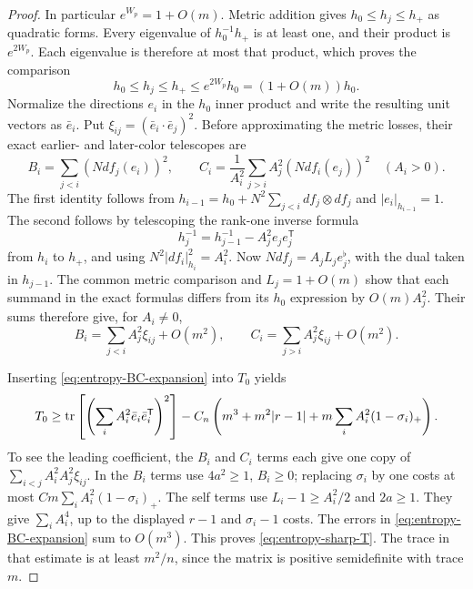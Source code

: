 \begin{proof}
In particular \(e^{W_p}=1+O(m)\).  Metric addition gives
\(h_0\leq h_j\leq h_+\) as quadratic forms.
Every eigenvalue of \(h_0^{-1}h_+\) is at least one, and their product
is \(e^{2W_p}\).  Each eigenvalue is therefore at most that product,
which proves the comparison
\[
 h_0\leq h_j\leq h_+\leq e^{2W_p}h_0=(1+O(m))h_0.
\]
Normalize the directions \(e_i\) in the \(h_0\) inner product and write
the resulting unit vectors as \(\bar e_i\).  Put
\(\xi_{ij}=(\bar e_i\cdot\bar e_j)^2\).  Before approximating the metric
losses, their exact earlier- and later-color telescopes are
\[
 B_i=\sum_{j<i}(Ndf_j(e_i))^2,\qquad
 C_i=\frac1{A_i^2}\sum_{j>i}A_j^2(Ndf_i(e_j))^2
       \quad(A_i>0).
\]
The first identity follows from
\(h_{i-1}=h_0+N^2\sum_{j<i}df_j\otimes df_j\) and
\(|e_i|_{h_{i-1}}=1\).  The second follows by telescoping the rank-one
inverse formula
\[
 h_j^{-1}=h_{j-1}^{-1}-A_j^2 e_j e_j^{\mathsf T}
\]
from \(h_i\) to \(h_+\), and using
\(N^2|df_i|_{h_i}^2=A_i^2\).  Now
\(Ndf_j=A_jL_j e_j^\flat\), with the dual taken in \(h_{j-1}\).
The common metric comparison and \(L_j=1+O(m)\) show that each summand
in the exact formulas differs from its \(h_0\) expression by
\(O(m)A_j^2\).  Their sums therefore give, for \(A_i\ne0\),
\begin{equation}\label{eq:entropy-BC-expansion}
 B_i=\sum_{j<i}A_j^2\xi_{ij}+O(m^2),\qquad
 C_i=\sum_{j>i}A_j^2\xi_{ij}+O(m^2).
\end{equation}

Inserting \eqref{eq:entropy-BC-expansion} into \(T_0\) yields
\begin{equation}\label{eq:entropy-sharp-T}
 T_0\geq
 \operatorname{tr}\left[\left(\sum_i A_i^2\bar e_i\bar e_i^{\mathsf T}\right)^2\right]
 -C_n\left(m^3+m^2|r-1|
              +m\sum_iA_i^2(1-\sigma_i)_+\right).
\end{equation}
To see the leading coefficient, the \(B_i\) and \(C_i\) terms each
give one copy of
\(\sum_{i<j}A_i^2A_j^2\xi_{ij}\).  In the \(B_i\) terms use
\(4a^2\geq1\), \(B_i\geq0\); replacing \(\sigma_i\) by one costs at most
\(Cm\sum_iA_i^2(1-\sigma_i)_+\).  The self terms use
\(L_i-1\geq A_i^2/2\) and \(2a\geq1\).  They give
\(\sum_iA_i^4\), up to the displayed \(r-1\) and \(\sigma_i-1\) costs.
The errors in \eqref{eq:entropy-BC-expansion} sum to \(O(m^3)\).
This proves \eqref{eq:entropy-sharp-T}.  The trace in that estimate
is at least \(m^2/n\), since the matrix is positive semidefinite
with trace \(m\).


\end{proof}
